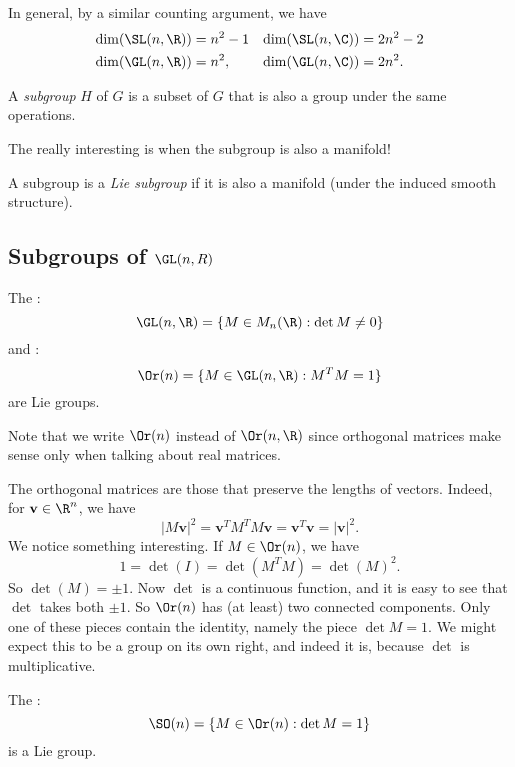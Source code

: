 \documentclass[a4paper]{article}
\begin{document}
In general, by a similar counting argument, we have
\begin{align*}
  \dim (\SL(n, \R)) &= n^2 - 1& \dim (\SL(n, \C)) &= 2n^2 - 2\\
  \dim (\GL(n, \R)) &= n^2,& \dim(\GL(n, \C)) &= 2n^2.
\end{align*}

\begin{defi}[Subgroup]
  A \emph{subgroup} $H$ of $G$ is a subset of $G$ that is also a group under the same operations.
\end{defi}

The really interesting is when the subgroup is also a manifold!
\begin{defi}
  A subgroup is a \emph{Lie subgroup} if it is also a manifold (under the induced smooth structure).
\end{defi}

\subsection{Subgroups of \texorpdfstring{$\GL(n, R)$}{GL(n, R)}}
\begin{lemma}
  The :
  \[
    \GL(n, \R) = \{M \in M_n(\R): \det M \not= 0\}
  \]
  and :
  \[
    \Or(n) = \{M \in \GL(n, \R): M^TM = 1\}
  \]
  are Lie groups.
\end{lemma}
Note that we write $\Or(n)$ instead of $\Or(n, \R)$ since orthogonal matrices make sense only when talking about real matrices.

The orthogonal matrices are those that preserve the lengths of vectors. Indeed, for $\mathbf{v}\in \R^n$, we have
\[
  |M\mathbf{v}|^2 = \mathbf{v}^T M^T M \mathbf{v} = \mathbf{v}^T \mathbf{v} = |\mathbf{v}|^2.
\]
We notice something interesting. If $M \in \Or(n)$, we have
\[
  1 = \det(I) = \det(M^TM) = \det(M)^2.
\]
So $\det(M) = \pm 1$. Now $\det$ is a continuous function, and it is easy to see that $\det$ takes both $\pm 1$. So $\Or(n)$ has (at least) two connected components. Only one of these pieces contain the identity, namely the piece $\det M = 1$. We might expect this to be a group on its own right, and indeed it is, because $\det$ is multiplicative.
\begin{lemma}
  The :
  \[
    \SO(n) = \{M \in \Or(n): \det M = 1\}
  \]
  is a Lie group.
\end{lemma}
\end{document}
